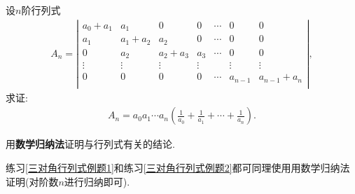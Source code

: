 \documentclass[lang=cn,newtx,10pt,scheme=chinese]{elegantbook}
\begin{document}
\begin{exercise}\label{使用数学归纳法计算行列式例题1}
    设$n$阶行列式
    \begin{align}
        A_n=\left| \begin{matrix}
            a_0+a_1&		a_1&		0&		0&		\cdots&		0&		0\\
            a_1&		a_1+a_2&		a_2&		0&		\cdots&		0&		0\\
            0&		a_2&		a_2+a_3&		a_3&		\cdots&		0&		0\\
            \vdots&		\vdots&		\vdots&		\vdots&		&		\vdots&		\vdots\\
            0&		0&		0&		0&		\cdots&		a_{n-1}&		a_{n-1}+a_n\\
        \end{matrix} \right|,
        \nonumber
    \end{align}
    求证:
    \begin{align}
        A_n=a_0a_1\cdots a_n\left( \frac{1}{a_0}+\frac{1}{a_1}+\cdots +\frac{1}{a_n} \right) .
        \nonumber
    \end{align}
\end{exercise}
\begin{note}
    用\hypertarget{用数学归纳法与行列式有关的结论}{\textbf{数学归纳法}}证明与行列式有关的结论.

    练习\ref{三对角行列式例题1}和练习\ref{三对角行列式例题2}都可同理使用用数学归纳法证明(对阶数$n$进行归纳即可).
\end{note}
\end{document}
